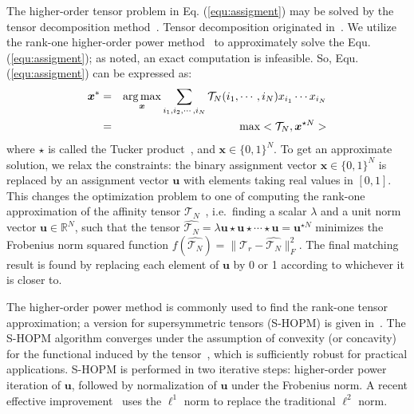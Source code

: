 The higher-order tensor problem in Eq. (\ref{equ:assigment}) may be solved by the tensor decomposition method~\cite{Kolda08}.
Tensor decomposition originated in~\cite{Hitchcock27}.
We utilize the rank-one higher-order power method~\cite{Lathauwer95} to approximately solve the Equ.(\ref{equ:assigment}); as noted, an exact computation is infeasible.
So, Equ.(\ref{equ:assigment}) can be expressed as:
\begin{eqnarray}
\label{equ:assigment2}
{\boldsymbol{x}}^* &=& \operatorname*{arg\,max}_{\boldsymbol{x}} \sum_{i_1,i_2,\cdots,i_N} \mathcal{T}_N(i_1,\cdots,i_N) x_{i_1} \cdots x_{i_N} \nonumber\\
&=& \max <\mathcal{T}_N, \boldsymbol{x}^{\star N}>
\end{eqnarray}
where $\star$ is called the Tucker product~\cite{Kofidis02}, and $\boldsymbol{x} \in \{0,1\}^{N}$.
To get an approximate solution, we relax the constraints:
the binary assignment vector $\boldsymbol{x}\in \{0,1\}^{N}$ is replaced by an assignment vector $\boldsymbol{u}$ with elements taking real values in $[0,1]$.
This changes the optimization problem to one of computing the rank-one approximation of the affinity tensor $\mathcal{T}_N$~\cite{Kofidis02},
i.e.\ finding a scalar $\lambda$ and a unit norm vector $\boldsymbol{u}\in \mathbb{R}^{N}$,
such that the tensor $\hat{\mathcal{T}_N} = \lambda \boldsymbol{u}\star \boldsymbol{u} \star\cdots \star \boldsymbol{u}=\boldsymbol{u}^{\star N}$ minimizes the Frobenius norm squared function $f(\hat{\mathcal{T}_N})=\lVert \mathcal{T}_r-\hat{\mathcal{T}_N} \lVert^2_F$.
The final matching result is found by replacing each element of $\boldsymbol{u}$ by 0 or 1 according to whichever it is closer to.

The higher-order power method is commonly used to find the rank-one tensor approximation;
a version for supersymmetric tensors (S-HOPM) is given in~\cite{Kofidis02}.
The S-HOPM algorithm converges under the assumption of convexity (or concavity) for the functional induced by the tensor~\cite{Kofidis02},
which is sufficiently robust for practical applications.
S-HOPM is performed in two iterative steps: higher-order power iteration of $\boldsymbol{u}$, followed by normalization of $\boldsymbol{u}$ under the Frobenius norm.
A recent effective improvement~\cite{Duchenne09} uses the $\mathcal{\ell}^1$ norm to replace the traditional $\mathcal{\ell}^2$ norm.

